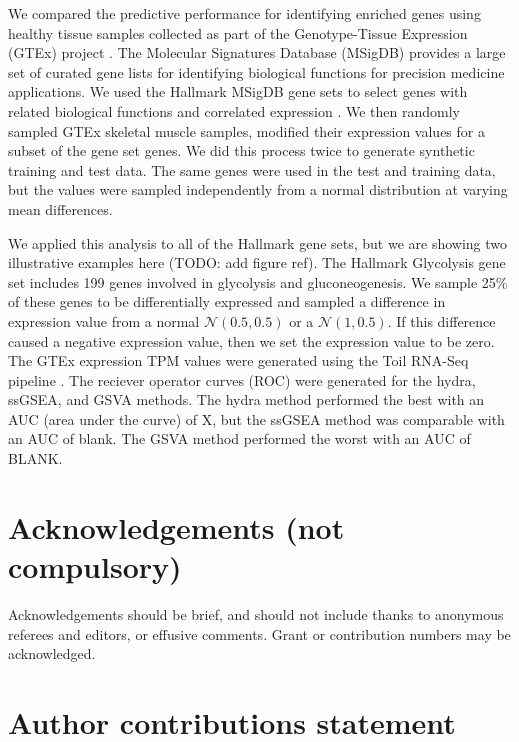 \documentclass[fleqn,10pt]{wlscirep}
\begin{document}
We compared the predictive performance for identifying enriched genes using healthy tissue samples collected as part of the Genotype-Tissue Expression (GTEx) project \cite{lonsdale2013genotype}. The Molecular Signatures Database (MSigDB) provides a large set of curated gene lists for identifying biological functions for precision medicine applications. We used the Hallmark MSigDB gene sets to select genes with related biological functions and correlated expression \cite{liberzon2015molecular}. We then randomly sampled GTEx skeletal muscle samples, modified their expression values for a subset of the gene set genes. We did this process twice to generate synthetic training and test data. The same genes were used in the test and training data, but the values were sampled independently from a normal distribution at varying mean differences. 

We applied this analysis to all of the Hallmark gene sets, but we are showing two illustrative examples here (TODO: add figure ref). The Hallmark Glycolysis gene set includes 199 genes involved in glycolysis and gluconeogenesis. We sample 25\% of these genes to be differentially expressed and sampled a difference in expression value from a normal $\mathcal{N}(0.5, 0.5)$ or a $\mathcal{N}(1, 0.5)$. If this difference caused a negative expression value, then we set the expression value to be zero. The GTEx expression TPM values were generated using the Toil RNA-Seq pipeline \cite{vivian2017toil}. The reciever operator curves (ROC) were generated for the hydra, ssGSEA, and GSVA methods. The hydra method performed the best with an AUC (area under the curve) of X, but the ssGSEA method was comparable with an AUC of blank. The GSVA method performed the worst with an AUC of BLANK.





\section*{Acknowledgements (not compulsory)}

Acknowledgements should be brief, and should not include thanks to anonymous referees and editors, or effusive comments. Grant or contribution numbers may be acknowledged.

\section*{Author contributions statement}
\end{document}
